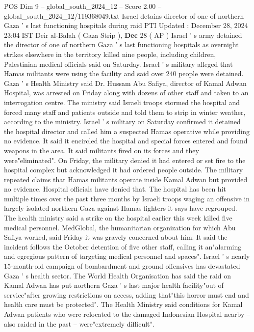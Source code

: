 \begin{textsample}{POS Dim 9 – global\_south\_2024\_12 – Score 2.00 – global\_south\_2024\_12/119368049.txt}  \label{ex:f9_pos_329}
Israel detains director of one of northern Gaza ' s last functioning hospitals during raid PTI Updated : December 28, 2024 23:04 IST Deir al-Balah ( Gaza Strip ), \textbf{Dec} 28 ( AP ) Israel ' s army detained the director of one of northern Gaza ' s last functioning hospitals as overnight strikes elsewhere in the territory killed nine people, including children, Palestinian medical officials said on Saturday.
Israel ' s military alleged that Hamas militants were using the facility and said over 240 people were detained.
Gaza ' s Health Ministry said Dr.
Hussam Abu Safiya, director of Kamal Adwan Hospital, was arrested on Friday along with dozens of other staff and taken to an interrogation centre.
The ministry said Israeli troops stormed the hospital and forced many staff and patients outside and told them to strip in winter weather, according to the ministry.
Israel ' s military on Saturday confirmed it detained the hospital director and called him a suspected Hamas operative while providing no evidence.
It said it encircled the hospital and special forces entered and found weapons in the area.
It said militants fired on its forces and they were"eliminated".
On Friday, the military denied it had entered or set fire to the hospital complex but acknowledged it had ordered people outside.
The military repeated claims that Hamas militants operate inside Kamal Adwan but provided no evidence.
Hospital officials have denied that.
The hospital has been hit multiple times over the past three months by Israeli troops waging an offensive in largely isolated northern Gaza against Hamas fighters it says have regrouped.
The health ministry said a strike on the hospital earlier this week killed five medical personnel.
MedGlobal, the humanitarian organization for which Abu Safiya worked, said Friday it was gravely concerned about him.
It said the incident follows the October detention of five other staff, calling it an"alarming and egregious pattern of targeting medical personnel and spaces".
Israel ' s nearly 15-month-old campaign of bombardment and ground offensives has devastated Gaza ' s health sector.
The World Health Organisation has said the raid on Kamal Adwan has put northern Gaza ' s last major health facility"out of service"after growing restrictions on access, adding that"this horror must end and health care must be protected".
The Health Ministry said conditions for Kamal Adwan patients who were relocated to the damaged Indonesian Hospital nearby -- also raided in the past -- were"extremely difficult".

\end{textsample}
